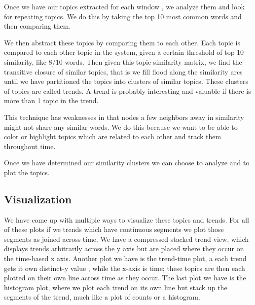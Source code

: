 \documentclass[times, 10pt,twocolumn]{article}
\begin{document}
Once we have our topics extracted for each window , we analyze them
and look for repeating topics. We do this by taking the top 10 most
common words and then comparing them. 

We then abstract these topics by comparing them to each other.  Each
topic is compared to each other topic in the system, given a certain
threshold of top 10 similarity, like 8/10 words. Then given this topic
similarity matrix, we find the transitive closure of similar topics,
that is we fill flood along the similarity arcs until we have
partitioned the topics into clusters of similar topics.  These
clusters of topics are called trends. A trend is probably interesting
and valuable if there is more than 1 topic in the trend.

This technique has weaknesses in that nodes a few neighbors away in
similarity might not share any similar words.  We do this because we
want to be able to color or highlight topics which are related to each
other and track them throughout time.

Once we have determined our similarity clusters we can choose to
analyze and to plot the topics.

\begin{comment}
Topic Clustering
 · Need to track continuous topics across
 · Similarity between topics
 · Clusters of the transitive closure of topics with X%
   similarity
    ­ Fill flood along similarity, make subsets of
      everyone who X%
      make that a cluster
\end{comment}

\subsection{Visualization}

We have come up with multiple ways to visualize these topics and
trends.  For all of these plots if we trends which have continuous
segments we plot those segments as joined across time.  We have a
compressed stacked trend view, which displays trends arbitrarily
across the y axis but are placed where they occur on the time-based x
axis. Another plot we have is the trend-time plot, a each trend gets
it own distinct-y value , while the x-axis is time; these topics are
then each plotted on their own line across time as they occur. The
last plot we have is the histogram plot, where we plot each trend on
its own line but stack up the segments of the trend, much like a plot
of counts or a histogram.
\end{document}
